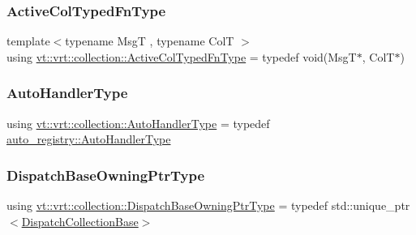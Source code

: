 \mbox{\label{namespacevt_1_1vrt_1_1collection_a1f4b9c5fe895842f49952a29592bc206}} 
\subsubsection{\texorpdfstring{Active\+Col\+Typed\+Fn\+Type}{ActiveColTypedFnType}}
{\footnotesize\ttfamily template$<$typename MsgT , typename ColT $>$ \\
using \hyperlink{namespacevt_1_1vrt_1_1collection_a1f4b9c5fe895842f49952a29592bc206}{vt\+::vrt\+::collection\+::\+Active\+Col\+Typed\+Fn\+Type} = typedef void(MsgT$\ast$, ColT$\ast$)}

\mbox{\label{namespacevt_1_1vrt_1_1collection_af50831782f9d77f86d626f858f295c37}} 
\subsubsection{\texorpdfstring{Auto\+Handler\+Type}{AutoHandlerType}}
{\footnotesize\ttfamily using \hyperlink{namespacevt_1_1vrt_1_1collection_af50831782f9d77f86d626f858f295c37}{vt\+::vrt\+::collection\+::\+Auto\+Handler\+Type} = typedef \hyperlink{namespacevt_1_1auto__registry_ae295e18699146815bb7d7674594d95d7}{auto\+\_\+registry\+::\+Auto\+Handler\+Type}}

\mbox{\label{namespacevt_1_1vrt_1_1collection_a124f83d203352b6bccc4f12ca489b68b}} 
\subsubsection{\texorpdfstring{Dispatch\+Base\+Owning\+Ptr\+Type}{DispatchBaseOwningPtrType}}
{\footnotesize\ttfamily using \hyperlink{namespacevt_1_1vrt_1_1collection_a124f83d203352b6bccc4f12ca489b68b}{vt\+::vrt\+::collection\+::\+Dispatch\+Base\+Owning\+Ptr\+Type} = typedef std\+::unique\+\_\+ptr$<$\hyperlink{structvt_1_1vrt_1_1collection_1_1_dispatch_collection_base}{Dispatch\+Collection\+Base}$>$}

